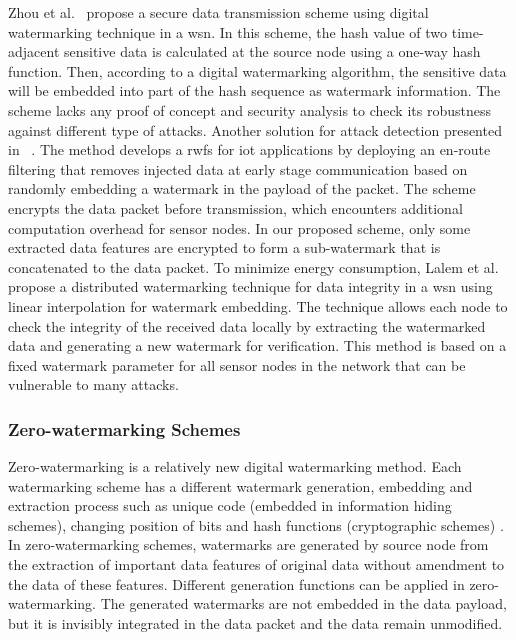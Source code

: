 \documentclass{llncs}
\begin{document}
Zhou et al.~\cite{Zhou2012} propose a secure data transmission scheme using digital watermarking technique in a \gls*{wsn}. In this scheme, the hash value of two time-adjacent sensitive data is calculated at the source node using a one-way hash function. Then, according to a digital watermarking algorithm, the sensitive data will be embedded into part of the hash sequence as watermark information. The scheme lacks any proof of concept and security analysis to check its robustness against different type of attacks. Another solution for attack detection presented in ~\cite{Alromith2018}. The method develops a \gls*{rwfs} for \gls*{iot} applications by  deploying an en-route filtering that removes injected data at early stage communication based on randomly embedding a watermark in the payload of the packet. The scheme encrypts the data packet before transmission, which encounters additional computation overhead for sensor nodes. In our proposed scheme, only some extracted data features are encrypted to form a sub-watermark that is concatenated to the data packet. To minimize energy consumption, Lalem et al.~\cite{Lalem2016} propose a distributed watermarking technique for data integrity in a \gls*{wsn} using linear interpolation for watermark embedding. The technique allows each node to check the integrity of the received data locally by extracting the watermarked data and generating a new watermark for verification. This method is based on a fixed watermark parameter for all sensor nodes in the network that can be vulnerable to many attacks. 


\subsubsection{Zero-watermarking Schemes}

Zero-watermarking is a relatively new digital watermarking method. Each watermarking scheme has a different watermark generation, embedding and extraction process such as unique code (embedded in information hiding schemes), changing position of bits and hash functions  (cryptographic \linebreak schemes) \cite{hameed2018}. In zero-watermarking schemes, watermarks are generated by source node from the extraction of important data features of original data without amendment to the data of these features. Different generation functions can be applied in zero-watermarking. The generated watermarks are not embedded in the data payload, but it is invisibly integrated in the data packet and the data remain unmodified. 
\end{document}
